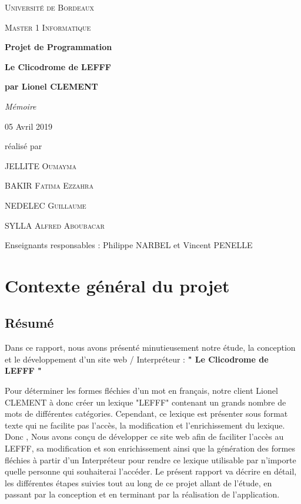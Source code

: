 \documentclass[12pt,a4paper]{article}
\begin{document}
\begin{titlepage}
\centering
{\scshape\LARGE Université de Bordeaux \par}
{\scshape\Large Master 1 Informatique  \par}
\vspace{3cm}

{\Huge\bfseries Projet de Programmation\par}
{\Huge\bfseries Le Clicodrome de LEFFF \par}
{\Large\bfseries par Lionel CLEMENT \par}
\vspace{0.5cm}
{\Large\itshape Mémoire \par}
{\large 05 Avril 2019\par}

\vfill
réalisé par \par
JELLITE \textsc{Oumayma} \par
BAKIR \textsc{Fatima Ezzahra} \par
NEDELEC \textsc{Guillaume} \par
SYLLA  \textsc{Alfred Aboubacar} \par
\vfill

{\large Enseignants responsables : Philippe NARBEL et Vincent PENELLE\par}

\end{titlepage}

\newpage
\tableofcontents

\newpage\section{Contexte général du projet}
\subsection{Résumé}

\smallbreak Dans ce rapport, nous avons présenté minutieusement notre étude, la conception et le développement d'un site web / Interpréteur :
    \textbf{" Le Clicodrome de LEFFF "}

Pour déterminer les formes fléchies d'un mot en français, notre client Lionel CLEMENT à donc créer un lexique "LEFFF"  contenant un grands nombre de mots de différentes catégories. Cependant, ce lexique est présenter sous format texte qui ne facilite pas l'accès, la modification et l'enrichissement du lexique.
Donc , Nous avons conçu de développer ce site web afin de faciliter l'accès au LEFFF, sa modification et son enrichissement ainsi que la génération des formes fléchies à partir d'un Interpréteur  pour  rendre ce lexique utilisable par n'importe quelle personne qui souhaiterai l'accéder.
Le présent rapport va décrire en détail, les différentes étapes suivies tout au long de ce projet allant de l'étude, 
en passant par la conception et en terminant par la réalisation de l'application.
\end{document}
